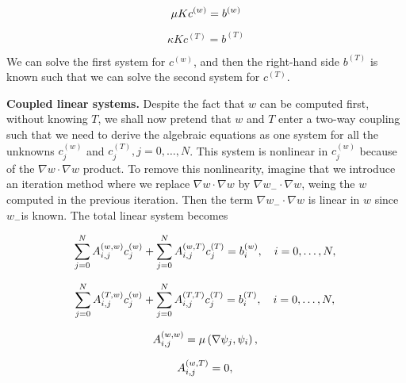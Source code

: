 \documentclass[../main.tex]{subfiles}
\begin{document}
		\begin{equation}
			\label{eqa276}
			\mu K c^{(w)}=b^{(w)} \\
		\end{equation}
	
		\begin{equation}
			\label{eqa277}
			\kappa K c^{(T)}=b^{(T)}
		\end{equation}
		
		We can solve the first system for $c^{(w)}$, and then the right-hand side $b^{(T)}$ is known such that we can solve the second system for $c^{(T)}$.\bigbreak
		
		\noindent \textbf{Coupled linear systems.   } Despite the fact that $w$ can be computed first, without knowing $T$, we shall now pretend that $w$ and $T$ enter a two-way coupling such that we need to derive the algebraic equations as one system for all the unknowns $c_{j}^{(w)}$ and $c_{j}^{(T)}, j=0, \ldots, N$. This system is nonlinear in $c_{j}^{(w)}$ because of the $\nabla w \cdot \nabla w$ product. To remove this nonlinearity, imagine that we introduce an iteration method where we replace $\nabla w \cdot \nabla w$ by $\nabla w_{-} \cdot \nabla w$, weing the $w$ computed in the previous iteration. Then the term $\nabla w_{-} \cdot \nabla w$ is linear in $w$ since $w_{-}$is known. The total linear system becomes
		
		\begin{equation}
			\label{eqa278}
			\sum_{j=0}^{N} A_{i, j}^{(w, w)} c_{j}^{(w)}+\sum_{j=0}^{N} A_{i, j}^{(w, T)} c_{j}^{(T)} =b_{i}^{(w)}, \quad i=0, \ldots, N, \\
		\end{equation}
	
		\begin{equation}
			\label{eqa279}
			\sum_{j=0}^{N} A_{i, j}^{(T, w)} c_{j}^{(w)}+\sum_{j=0}^{N} A_{i, j}^{(T, T)} c_{j}^{(T)} =b_{i}^{(T)}, \quad i=0, \ldots, N, \\
		\end{equation}
	
		\begin{equation}
			\label{eqa280}
			A_{i, j}^{(w, w)} =\mu\left(\nabla \psi_{j}, \psi_{i}\right), \\
		\end{equation}
	
		\begin{equation}
			\label{eqa281}
			A_{i, j}^{(w, T)} =0, \\
		\end{equation}
	
\end{document}

